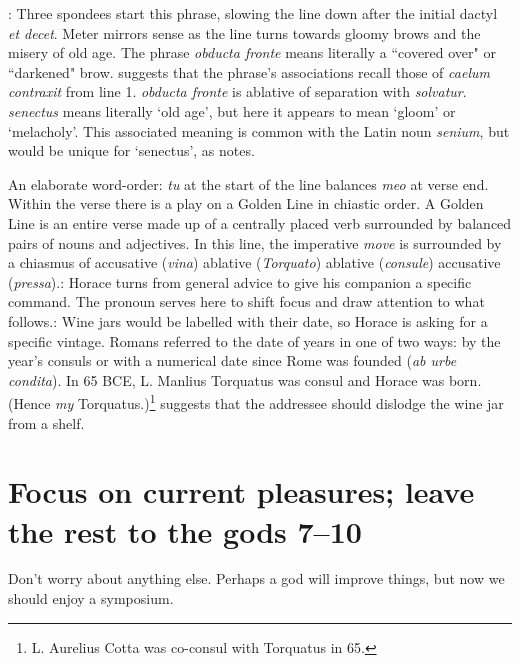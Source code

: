 
: Three spondees start this phrase, slowing the line down after the initial dactyl \textit{et decet}.  Meter mirrors sense as the line turns towards gloomy brows and the misery of old age.  The phrase \textit{obducta fronte} means literally a ``covered over" or ``darkened" brow.  \citet[217]{mankin1995} suggests that the phrase's associations recall those of \textit{caelum contraxit} from line 1.  \textit{obducta fronte} is ablative of separation with \textit{solvatur}.  \textit{senectus} means literally `old age', but here it appears to mean `gloom' or `melacholy'.  This associated meaning is common with the Latin noun \textit{senium}, but would be unique for `senectus', as \citet[217]{mankin1995} notes.


An elaborate word-order: \textit{tu} at the start of the line balances \textit{meo} at verse end. Within the verse there is a play on a Golden Line in chiastic order.  A Golden Line is an entire verse made up of a centrally placed verb surrounded by balanced pairs of nouns and adjectives.  In this line, the imperative \textit{move} is surrounded by a chiasmus of accusative (\textit{vina}) ablative (\textit{Torquato}) ablative (\textit{consule}) accusative (\textit{pressa}).\indent{}: Horace turns from general advice to give his companion a specific command.  The pronoun serves here to shift focus and draw attention to what follows.\indent{}: Wine jars would be labelled with their date, so Horace is asking for a specific vintage.  Romans referred to the date of years in one of two ways: by the year's consuls or with a numerical date since Rome was founded (\textit{ab urbe condita}).  In 65 BCE, L. Manlius Torquatus was consul and Horace was born.  (Hence \textit{my} Torquatus.)\footnote{L. Aurelius Cotta was co-consul with Torquatus in 65.}\indent{} suggests that the addressee should dislodge the wine jar from a shelf.


\section*{Focus on current pleasures; leave the rest to the gods 7--10}

Don't worry about anything else. Perhaps a god will improve things, but now we should enjoy a symposium.

